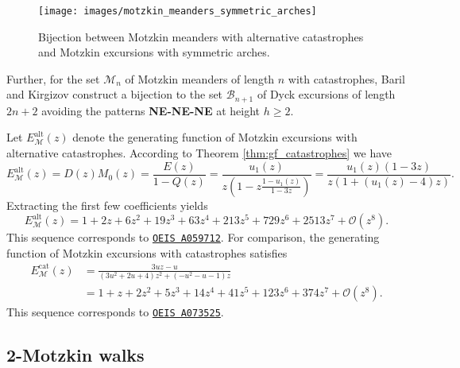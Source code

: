 \begin{figure}[hbt!]
  \centering
  \texttt{[image: images/motzkin\_meanders\_symmetric\_arches]}
  \caption[Bijection involving Motzkin meanders with alternative catastrophes.]{Bijection between Motzkin meanders with alternative catastrophes and Motzkin excursions with symmetric arches.}
  \label{fig:motzkin_meanders_symmetric_arches}
\end{figure}

Further, for the set $\mathcal{M}_n$ of Motzkin meanders of length $n$ with catastrophes, Baril and Kirgizov \cite[Theorem 3]{Bijections} construct a bijection to the set $\mathcal{B}_{n+1}$ of Dyck excursions of length $2n+2$ avoiding the patterns \textbf{NE-NE-NE} at height $h \geq 2$.

\begin{example} \label{ex:motzkin_excursions}
  Let $E_\mathcal{M}^\mathrm{alt}(z)$ denote the generating function of Motzkin excursions with alternative catastrophes. According to Theorem \ref{thm:gf_catastrophes} we have 
  $$
    E_\mathcal{M}^\mathrm{alt}(z) = D(z)M_0(z) = \frac{E(z)}{1 - Q(z)} = \frac{u_1(z)}{z\left(1 - z\frac{1 - u_1(z)}{1 - 3z}\right)} = \frac{u_{1}(z)(1 - 3z)}{z(1 + (u_{1}(z) - 4)z)}.
  $$
  Extracting the first few coefficients yields 
  $$ 
    E_\mathcal{M}^\mathrm{alt}(z) = 1 + 2z + 6z^{2} + 19z^{3} + 63z^{4} + 213z^{5} + 729z^{6} + 2513z^{7} + \mathcal{O}(z^{8}).
  $$
  This sequence corresponds to \href{https://oeis.org/A059712}{\texttt{OEIS A059712}}.
  For comparison, the generating function of Motzkin excursions with catastrophes satisfies
  \begin{align*}
    E_\mathcal{M}^\mathrm{cat}(z) &= \frac{3 u z -u}{\left(3 u^{2}+2 u +4\right) z^{2}+\left(-u^{2}-u -1\right) z} \\
    &= 1 + z + 2z^2 + 5z^3 + 14z^4 + 41z^5 + 123z^6 + 374z^7 + \mathcal{O}(z^8).
  \end{align*}
  This sequence corresponds to \href{https://oeis.org/A073525}{\texttt{OEIS A073525}}.
\end{example}


\subsection{2-Motzkin walks}

